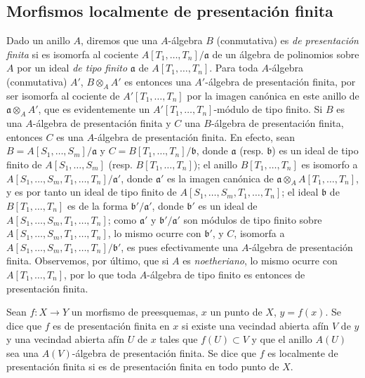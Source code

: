 \subsection{Morfismos localmente de presentación finita}
\label{subsection:IV.1.4-fr}

\begin{env}[1.4.1]
\label{IV.1.4.1-fr}
Dado un anillo $A$, diremos que una $A$-álgebra $B$ (conmutativa)
es \emph{de presentación finita} si es isomorfa al cociente
$A[T_1,\ldots,T_n]/\mathfrak a$ de un álgebra de polinomios sobre $A$ por un
ideal \emph{de tipo finito} $\mathfrak a$ de $A[T_1,\ldots,T_n]$. Para toda
$A$-álgebra (conmutativa) $A'$, $B\otimes_AA'$ es entonces una $A'$-álgebra de
presentación finita, por ser isomorfa al cociente de $A'[T_1,\ldots,T_n]$ por
la imagen canónica en este anillo de $\mathfrak a\otimes_AA'$, que es
evidentemente un $A'[T_1,\ldots,T_n]$-módulo de tipo finito. Si $B$ es una
$A$-álgebra de presentación finita y $C$ una $B$-álgebra de presentación
finita, entonces $C$ es una $A$-álgebra de presentación finita. En efecto, sean
$B=A[S_1,\ldots,S_m]/\mathfrak a$ y
$C=B[T_1,\ldots,T_n]/\mathfrak b$, donde $\mathfrak a$ (resp. $\mathfrak b$) es
un ideal de tipo finito de $A[S_1,\ldots,S_m]$ (resp.
$B[T_1,\ldots,T_n]$); el anillo $B[T_1,\ldots,T_n]$ es isomorfo a
$A[S_1,\ldots,S_m,T_1,\ldots,T_n]/\mathfrak a'$, donde $\mathfrak a'$ es
la imagen canónica de
$\mathfrak a\otimes_AA[T_1,\ldots,T_n]$, y es por tanto un ideal de tipo finito de
$A[S_1,\ldots,S_m,T_1,\ldots,T_n]$; el ideal $\mathfrak b$ de
$B[T_1,\ldots,T_n]$ es de la forma $\mathfrak b'/\mathfrak a'$, donde
$\mathfrak b'$ es un ideal de $A[S_1,\ldots,S_m,T_1,\ldots,T_n]$; como
$\mathfrak a'$ y $\mathfrak b'/\mathfrak a'$ son módulos de tipo finito
sobre $A[S_1,\ldots,S_m,T_1,\ldots,T_n]$, lo mismo ocurre con $\mathfrak b'$,
y $C$, isomorfa a
$A[S_1,\ldots,S_m,T_1,\ldots,T_n]/\mathfrak b'$, es pues efectivamente una
$A$-álgebra de presentación finita. Observemos, por último, que si $A$ es
\emph{noetheriano}, lo mismo ocurre con $A[T_1,\ldots,T_n]$, por lo que toda
$A$-álgebra de tipo finito es entonces de presentación finita.
\end{env}

\begin{definition}[1.4.2]
\label{IV.1.4.2-fr}
Sean $f:X\to Y$ un morfismo de preesquemas, $x$ un punto de $X$, $y=f(x)$.
Se dice que $f$ es de presentación finita en $x$ si existe una vecindad
abierta afín $V$ de $y$ y una vecindad abierta afín $U$ de $x$ tales que
$f(U)\subset V$ y que el anillo $A(U)$ sea una $A(V)$-álgebra de presentación
finita. Se dice que $f$ es localmente de presentación finita si es de
presentación finita en todo punto de $X$.
\end{definition}

